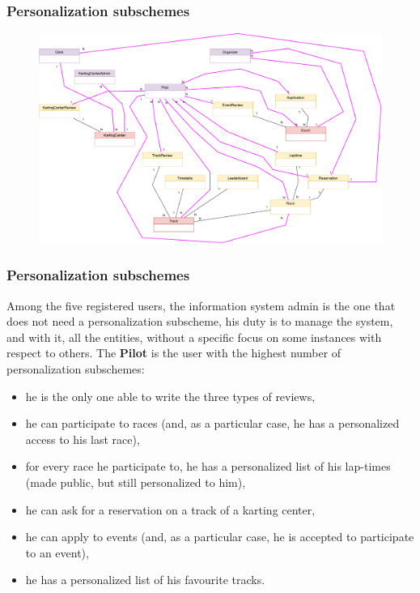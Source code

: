 \documentclass{beamer}
\begin{document}
\begin{frame}
    \frametitle{Personalization subschemes}
    \begin{figure}
        \centering
        \includegraphics[width=1\linewidth]{drawio/personalization-subschemes-cropped.pdf}
    \end{figure}
\end{frame}

\begin{frame}
    \frametitle{Personalization subschemes}
    \scriptsize
    Among the five registered users, the information system admin is the one that does not need a 
    personalization subscheme, his duty is to manage the system, and with it, all the entities, without
    a specific focus on some instances with respect to others.
    The \textbf{Pilot} is the user with the highest number of personalization subschemes: 
    \begin{itemize}
        \item he is the only one able to write the three types of reviews,
        \item he can participate to races (and, as a particular case,
        he has a personalized access to his last race),
        \item for every race he participate to, he has a personalized list of his lap-times (made public, but still
        personalized to him),
        \item he can ask for a reservation on a track of a karting center,
        \item he can apply to events (and, as a particular case, he is accepted to participate
        to an event),
        \item he has a personalized list of his favourite tracks.
    \end{itemize}
\end{frame}
\end{document}
